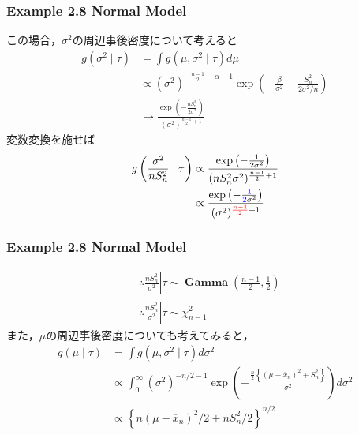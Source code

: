 \documentclass[dvipdfmx,cjk]{beamer}
\theoremstyle{example}
\DeclareMathOperator{\Gam}{\mathbf{Gamma}}
\begin{document}
\begin{frame}
    \frametitle{Example 2.8 Normal Model}
    この場合，$\sigma^2$の周辺事後密度について考えると
    \begin{align*}
        g(\sigma^2\mid\tau) & =\int g(\mu,\sigma^2\mid\tau)d\mu                                                                              \\
                            & \propto (\sigma^2)^{-\frac{n-1}{2}-\alpha-1}\exp\left(-\frac{\beta}{\sigma^2}-\frac{S^2_n}{2\sigma^2/n}\right) \\
                            & \longrightarrow \frac{\exp\left(-\frac{nS^2_n}{2\sigma^2}\right)}{(\sigma^2)^{\frac{n-1}{2}+1}}
    \end{align*}
    変数変換を施せば
    \begin{align*}
        g\left(\frac{\sigma^2}{nS^2_n}\mid\tau\right) & \propto \frac{\exp\left(-\frac{1}{2\sigma^2}\right)}{(nS^2_n\sigma^2)^{\frac{n-1}{2}+1}}                                    \\
                                                      & \propto \frac{\exp\left(-\frac{{\color{blue}1}}{{\color{blue}2}\sigma^2}\right)}{(\sigma^2)^{{\color{red}\frac{n-1}{2}}+1}} \\
    \end{align*}
\end{frame}

\begin{frame}
    \frametitle{Example 2.8 Normal Model}
    \begin{align*}
         & \therefore \left.\frac{nS^2_n}{\sigma^2}\right|\tau\sim\Gam\left(\frac{n-1}{2},\frac{1}{2}\right) \\
         & \therefore \left.\frac{nS^2_n}{\sigma^2}\right|\tau\sim\chi^2_{n-1}
    \end{align*}
    また，$\mu$の周辺事後密度についても考えてみると，
    \begin{align*}
        g(\mu\mid\tau) & =\int g(\mu,\sigma^2\mid\tau)d\sigma^2                                                                                                          \\
                       & \propto \int_{0}^{\infty} (\sigma^2)^{-n/2-1}\exp\left(-\frac{\frac{n}{2}\left\{(\mu-\overline{x}_n)^2+S^2_n\right\}}{\sigma^2}\right)d\sigma^2 \\
                       & \propto \left\{n(\mu-\overline{x}_n)^2/2+nS^2_n/2\right\}^{n/2}
    \end{align*}
\end{frame}
\end{document}
